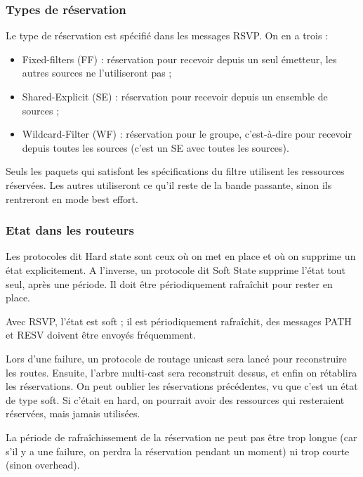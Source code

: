 \documentclass[10pt,a4paper]{report}
\begin{document}
		
			\subsubsection{Types de réservation}
			
			Le type de réservation est spécifié dans les messages RSVP. On en a trois :
			
			\begin{itemize}
				\item Fixed-filters (FF) : réservation pour recevoir depuis un seul émetteur, les autres sources ne l'utiliseront pas ;
				\item Shared-Explicit (SE) : réservation pour recevoir depuis un ensemble de sources ;
				\item Wildcard-Filter (WF) : réservation pour le groupe, c'est-à-dire pour recevoir depuis toutes les sources (c'est un SE avec toutes les sources).
			\end{itemize}
			
			Seuls les paquets qui satisfont les spécifications du filtre utilisent les ressources réservées. Les autres utiliseront ce qu'il reste de la bande passante, sinon ils rentreront en mode best effort.
			
			\subsubsection{Etat dans les routeurs}
		
			Les protocoles dit Hard state sont ceux où on met en place et où on supprime un état explicitement. A l'inverse, un protocole dit Soft State supprime l'état tout seul, après une période. Il doit être périodiquement rafraîchit pour rester en place.
			
			Avec RSVP, l'état est soft ; il est périodiquement rafraîchit, des messages PATH et RESV doivent être envoyés fréquemment.
			
			Lors d'une failure, un protocole de routage unicast sera lancé pour reconstruire les routes. Ensuite, l'arbre multi-cast sera reconstruit dessus, et enfin on rétablira les réservations. On peut oublier les réservations précédentes, vu que c'est un état de type soft. Si c'était en hard, on pourrait avoir des ressources qui resteraient réservées, mais jamais utilisées.
		
			La période de rafraîchissement de la réservation ne peut pas être trop longue (car s'il y a une failure, on perdra la réservation pendant un moment) ni trop courte (sinon overhead).
		
\end{document}
